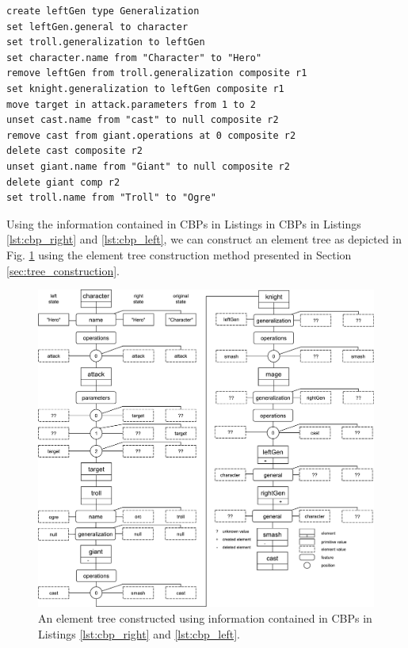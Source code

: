 \begin{lstlisting}[firstnumber=29,style=eol,caption={The appended events made by Bob to produce the left model in Fig. \ref{fig:class_diagram_left} (left version).},label=lst:cbp_left]
create leftGen type Generalization
set leftGen.general to character
set troll.generalization to leftGen
set character.name from "Character" to "Hero"
remove leftGen from troll.generalization composite r1
set knight.generalization to leftGen composite r1
move target in attack.parameters from 1 to 2
unset cast.name from "cast" to null composite r2
remove cast from giant.operations at 0 composite r2
delete cast composite r2
unset giant.name from "Giant" to null composite r2
delete giant comp r2
set troll.name from "Troll" to "Ogre"
\end{lstlisting}

Using the information contained in CBPs in Listings in CBPs in Listings \ref{lst:cbp_right} and \ref{lst:cbp_left}, we can construct an element tree as depicted in Fig. \ref{fig:element_tree_game} using the element tree construction method presented in Section \ref{sec:tree_construction}.

\begin{figure}
    \centering
    \includegraphics[width=\linewidth]{element_tree_game}
    \caption{An element tree constructed using information contained in CBPs in Listings \ref{lst:cbp_right} and \ref{lst:cbp_left}.}
    \label{fig:element_tree_game}
\end{figure} 

